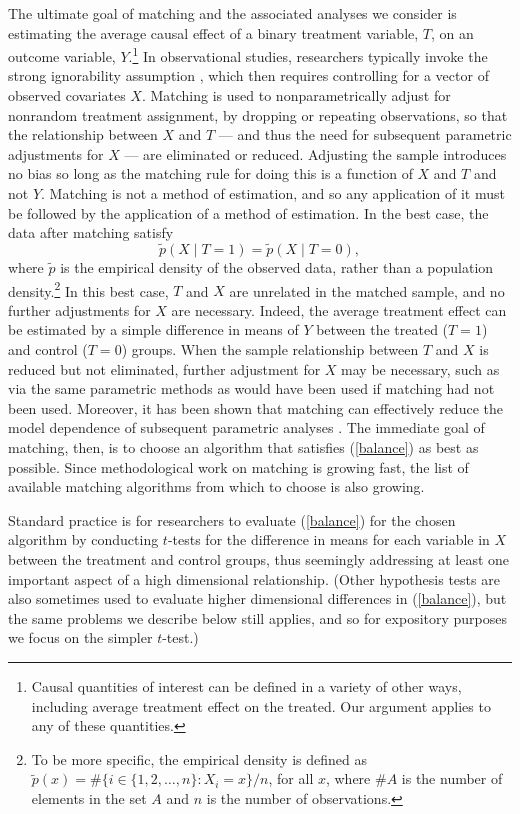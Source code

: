 \documentclass[11pt,titlepage]{article}
\begin{document}
The ultimate goal of matching and the associated analyses we consider
is estimating the average causal effect of a binary treatment
variable, $T$, on an outcome variable, $Y$.\footnote{Causal quantities
  of interest can be defined in a variety of other ways, including
  average treatment effect on the treated.  Our argument applies to
  any of these quantities.}  In observational studies, researchers
typically invoke the strong ignorability assumption \citep{RosRub83},
which then requires controlling for a vector of observed covariates
$X$.  Matching is used to nonparametrically adjust for nonrandom
treatment assignment, by dropping or repeating observations, so that
the relationship between $X$ and $T$ --- and thus the need for
subsequent parametric adjustments for $X$ --- are eliminated or
reduced.  Adjusting the sample introduces no bias so long as the
matching rule for doing this is a function of $X$ and $T$ and not $Y$.
Matching is not a method of estimation, and so any application of it
must be followed by the application of a method of estimation.  In the
best case, the data after matching satisfy
\begin{equation}
  \label{balance}
  \tilde p(X\mid T=1) = \tilde p(X\mid T=0),
\end{equation}
where $\tilde p$ is the empirical density of the observed data, rather
than a population density.\footnote{To be more specific, the empirical
  density is defined as $\tilde p(x) = \# \{ i\in \{1, 2, \dots, n \}:
  X_i = x \} / n$, for all $x$, where $\#A$ is the number of elements
  in the set $A$ and $n$ is the number of observations. } In this best
case, $T$ and $X$ are unrelated in the matched sample, and no further
adjustments for $X$ are necessary. Indeed, the average treatment
effect can be estimated by a simple difference in means of $Y$ between
the treated ($T=1$) and control ($T=0$) groups.  When the sample
relationship between $T$ and $X$ is reduced but not eliminated,
further adjustment for $X$ may be necessary, such as via the same
parametric methods as would have been used if matching had not been
used. Moreover, it has been shown that matching can effectively reduce
the model dependence of subsequent parametric analyses
\citep{HoImaKin06}.  The immediate goal of matching, then, is to
choose an algorithm that satisfies (\ref{balance}) as best as
possible.  Since methodological work on matching is growing fast, the
list of available matching algorithms from which to choose is also
growing.

Standard practice is for researchers to evaluate (\ref{balance}) for
the chosen algorithm by conducting $t$-tests for the difference in
means for each variable in $X$ between the treatment and control
groups, thus seemingly addressing at least one important aspect of a
high dimensional relationship.  (Other hypothesis tests are also
sometimes used to evaluate higher dimensional differences in
(\ref{balance}), but the same problems we describe below still
applies, and so for expository purposes we focus on the simpler
$t$-test.)
\end{document}
